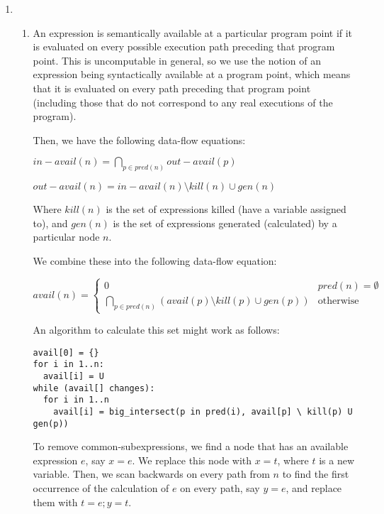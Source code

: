 


\begin{enumerate}[label=(\alph*)]
  \item
    \begin{enumerate}[label=(\roman*)]

      \item

        An expression is semantically available at a particular program point if it is evaluated on every possible execution path preceding that program point. This is uncomputable in general, so we use the notion of an expression being syntactically available at a program point, which means that it is evaluated on every path preceding that program point (including those that do not correspond to any real executions of the program).

        Then, we have the following data-flow equations:

        $in-avail(n) = \bigcap_{p \in pred(n)} out-avail(p)$

        $out-avail(n) = in-avail(n) \setminus kill(n) \cup gen(n)$

        Where $kill(n)$ is the set of expressions killed (have a variable assigned to), and $gen(n)$ is the set of expressions generated (calculated) by a particular node $n$.

        We combine these into the following data-flow equation:

        $avail(n) = \begin{cases}0 & pred(n) = \emptyset\\\bigcap_{p \in pred(n)} (avail(p) \setminus kill(p) \cup gen(p))&\text{otherwise}\end{cases}$

        An algorithm to calculate this set might work as follows:

\begin{verbatim}
avail[0] = {}
for i in 1..n:
  avail[i] = U
while (avail[] changes):
  for i in 1..n
    avail[i] = big_intersect(p in pred(i), avail[p] \ kill(p) U gen(p))
\end{verbatim}

To remove common-subexpressions, we find a node that has an available expression $e$, say $x = e$. We replace this node with $x=t$, where $t$ is a new variable. Then, we scan backwards on every path from $n$ to find the first occurrence of the calculation of $e$ on every path, say $y=e$, and replace them with $t=e;y=t$.


\end{enumerate}
\end{enumerate}
